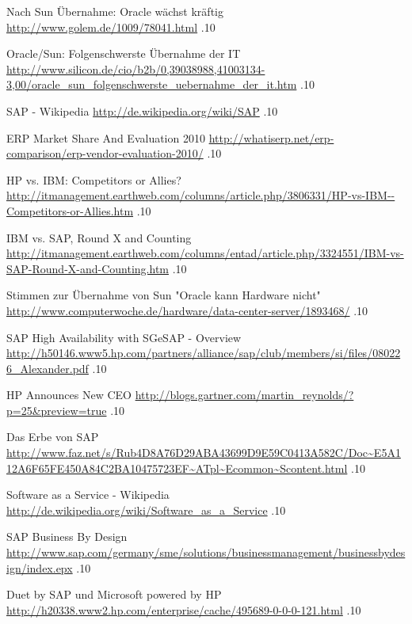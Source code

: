 \documentclass[a4paper,10pt,left=1.5cm,right=1.5cm,top=1.5cm,bottom=1.5cm]{article}
\begin{document}
\begin{thebibliography}{5}
  \newblock Nach Sun Übernahme: Oracle wächst kräftig 
  \newblock \url{http://www.golem.de/1009/78041.html}
  .10

  \newblock Oracle/Sun: Folgenschwerste Übernahme der IT
  \newblock \url{http://www.silicon.de/cio/b2b/0,39038988,41003134-3,00/oracle_sun_folgenschwerste_uebernahme_der_it.htm}
  .10

  \newblock SAP - Wikipedia
  \newblock \url{http://de.wikipedia.org/wiki/SAP}
  .10

  \newblock ERP Market Share And Evaluation 2010
  \newblock \url{http://whatiserp.net/erp-comparison/erp-vendor-evaluation-2010/}
  .10

  \newblock HP vs. IBM: Competitors or Allies?
  \newblock \url{http://itmanagement.earthweb.com/columns/article.php/3806331/HP-vs-IBM--Competitors-or-Allies.htm}
  .10

  \newblock IBM vs. SAP, Round X and Counting
  \newblock \url{http://itmanagement.earthweb.com/columns/entad/article.php/3324551/IBM-vs-SAP-Round-X-and-Counting.htm}
  .10

  \newblock Stimmen zur Übernahme von Sun "Oracle kann Hardware nicht"
  \newblock \url{http://www.computerwoche.de/hardware/data-center-server/1893468/}
  .10

  \newblock SAP High Availability with SGeSAP - Overview
  \newblock \url{http://h50146.www5.hp.com/partners/alliance/sap/club/members/si/files/080226_Alexander.pdf}
  .10

  \newblock HP Announces New CEO
  \newblock \url{http://blogs.gartner.com/martin_reynolds/?p=25&preview=true}
  .10

  \newblock Das Erbe von SAP
  \newblock \url{http://www.faz.net/s/Rub4D8A76D29ABA43699D9E59C0413A582C/Doc~E5A112A6F65FE450A84C2BA10475723EF~ATpl~Ecommon~Scontent.html}
  .10

  \newblock Software as a Service - Wikipedia
  \newblock \url{http://de.wikipedia.org/wiki/Software_as_a_Service}
  .10

  \newblock SAP Business By Design
  \newblock \url{http://www.sap.com/germany/sme/solutions/businessmanagement/businessbydesign/index.epx}
  .10

  \newblock Duet by SAP und Microsoft powered by HP
  \newblock \url{http://h20338.www2.hp.com/enterprise/cache/495689-0-0-0-121.html}
  .10
\end{thebibliography}
\end{document}
